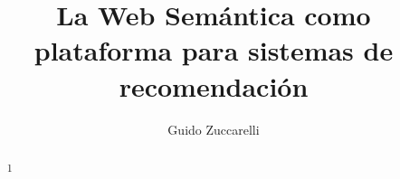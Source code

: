 \documentclass[a4paper,10pt]{article}
\title{La Web Semántica como plataforma para sistemas de recomendación}
\author{Guido Zuccarelli}
\begin{document}
\maketitle

\begin{abstract}1

\end{abstract}






















\end{document}
